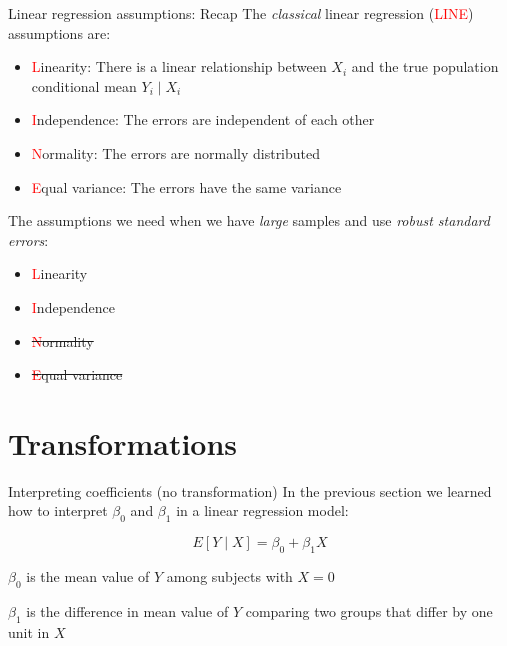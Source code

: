 \documentclass[10pt,t]{beamer}
\begin{document}
\begin{frame}{Linear regression assumptions: Recap}
The \textit{classical} linear regression (\textcolor{red}{LINE}) assumptions are:

\vspace{0.3cm}

\begin{itemize}
	\item \textcolor{red}{L}inearity: There is a linear relationship between $X_i$ and the true population conditional mean $Y_i \mid X_i$
	\item \textcolor{red}{I}ndependence: The errors are independent of each other
	\item \textcolor{red}{N}ormality: The errors are normally distributed
	\item \textcolor{red}{E}qual variance: The errors have the same variance
\end{itemize}

\vspace{0.3cm}

The assumptions we need when we have \textit{large} samples and use \textit{robust standard errors}:

\vspace{0.3cm}

\begin{itemize}
	\item \textcolor{red}{L}inearity
	\item \textcolor{red}{I}ndependence
	\item \sout{\textcolor{red}{N}ormality}
	\item \sout{\textcolor{red}{E}qual variance}
\end{itemize}

\end{frame}


\section{Transformations}

\begin{frame}{Interpreting coefficients (no transformation)}
In the previous section we learned how to interpret $\beta_0$ and $\beta_1$ in a linear regression model:

$$
E[Y \mid X] = \beta_0 + \beta_1 X
$$

\vspace{0.2cm}

$\beta_0$ is the mean value of $Y$ among subjects with $X = 0$

\vspace{0.3cm}

$\beta_1$ is the difference in mean value of $Y$ comparing two groups that differ by one unit in $X$


\end{frame}
\end{document}
